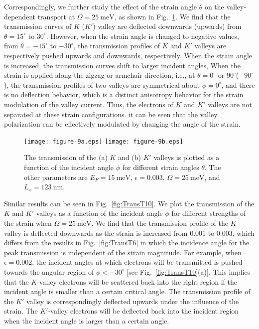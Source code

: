\documentclass[reprint,amsmath,amssymb,aps,superscriptaddress]{revtex4-2}
\begin{document}
Correspondingly, we further study the effect of the strain angle $\theta$ on the valley-dependent transport at $\Omega=25\ \mathrm{meV}$, as shown in Fig.~\ref{fig:TransT9}. We find that the transmission curves of $K$ ($K'$) valley are deflected downwards (upwards) from $\theta=15^\circ$ to $30^\circ$. However, when the strain angle is changed to negative values, from $\theta=-15^\circ$ to $-30^\circ$, the transmission profiles of $K$ and $K'$ valleys are respectively pushed upwards and downwards, respectively. When the strain angle is increased, the transmission curves shift to larger incident angles,  When the strain is applied along the zigzag or armchair direction, i.e., at $\theta=0^\circ$ or $90^\circ$($-90^\circ$), the transmission profiles of two valleys are symmetrical about $\phi=0^\circ$, and there is no deflection behavior, which is a distinct anisotropy behavior for the strain modulation of the valley current. Thus, the electrons of $K$ and  $K'$ valleys are not separated at these strain configurations. it can be seen that the valley polarization can be effectively modulated by changing the angle of the strain.
\begin{figure}[b]
	\centering
	\texttt{[image: figure-9a.eps]}%
	\texttt{[image: figure-9b.eps]}%
	\caption{\label{fig:TransT9} The transmission of the (a) $K$ and (b) $K'$ valleys is plotted as a function of the incident angle $\phi$ for different strain angles $\theta$. The other parameters are $E_F=15\ \mathrm{meV}$, $\epsilon=0.003$, $\Omega=25\ \mathrm{meV}$, and $L_{x}=123\ \mathrm{nm}$.}
\end{figure}

Similar results can be seen in Fig.~\ref{fig:TransT10}. We plot the transmission of the $K$ and $K'$ valleys as a function of the incident angle $\phi$ for different strengths of the strain when $\Omega=25\ \mathrm{meV}$.
We find that the transmission profile of the $K$ valley is deflected downwards as the strain is increased from $0.001$ to
$0.003$, which differs from the results in Fig.~\ref{fig:TransT6} in which the incidence angle for the peak transmission is independent of the strain magnitude. For example, when $\epsilon=0.002$, the incident angles at which electrons will be transmitted is pushed towards the angular region of $\phi<-30^\circ$ [see Fig.~\ref{fig:TransT10}(a)]. This implies that the $K$-valley electrons will be scattered back into the right region if the incident angle is smaller than a certain critical angle. The transmission profile of the $K'$ valley is correspondingly deflected upwards under the influence of the strain.
The $K'$-valley electrons will be deflected back into the incident region when the incident angle is larger than a certain angle.
\end{document}
